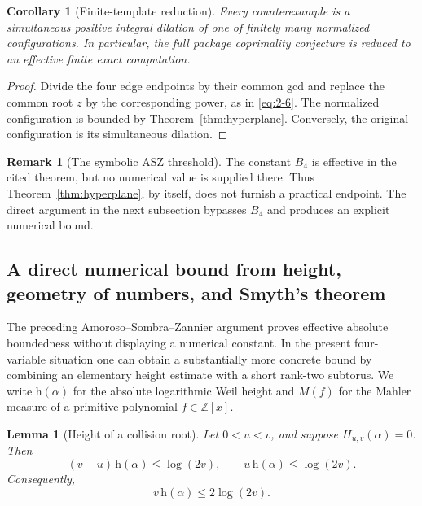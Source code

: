 \documentclass[11pt]{article}
\numberwithin{equation}{section}
\newtheorem{lemma}[theorem]{Lemma}
\newtheorem{corollary}[theorem]{Corollary}
\theoremstyle{definition}
\newtheorem{remark}[theorem]{Remark}
\newcommand{\Z}{\mathbb Z}
\begin{document}
\begin{corollary}[Finite-template reduction]\label{cor:finiteglobal}
Every counterexample is a simultaneous positive integral dilation of one of
finitely many normalized configurations.  In particular, the full package
coprimality conjecture is reduced to an effective finite exact computation.
\end{corollary}

\begin{proof}
Divide the four edge endpoints by their common gcd and replace the common
root \(z\) by the corresponding power, as in \eqref{eq:2-6}.  The normalized
configuration is bounded by Theorem~\ref{thm:hyperplane}.  Conversely, the
original configuration is its simultaneous dilation.
\end{proof}

\begin{remark}[The symbolic ASZ threshold]
The constant \(B_4\) is effective in the cited theorem, but no numerical
value is supplied there.  Thus Theorem~\ref{thm:hyperplane}, by itself, does
not furnish a practical endpoint.  The direct argument in the next subsection
bypasses \(B_4\) and produces an explicit numerical bound.
\end{remark}

\subsection{A direct numerical bound from height, geometry of numbers, and Smyth's theorem}
\label{subsec:explicitbound}

The preceding Amoroso--Sombra--Zannier argument proves effective absolute
boundedness without displaying a numerical constant.  In the present
four-variable situation one can obtain a substantially more concrete bound
by combining an elementary height estimate with a short rank-two subtorus.
We write \(\mathrm h(\alpha)\) for the absolute logarithmic Weil height and
\(M(f)\) for the Mahler measure of a primitive polynomial \(f\in\Z[x]\).

\begin{lemma}[Height of a collision root]\label{lem:collisionheight}
Let \(0<u<v\), and suppose \(H_{u,v}(\alpha)=0\).  Then
\begin{equation}
 (v-u)\,\mathrm h(\alpha)\leq\log(2v),
 \qquad
 u\,\mathrm h(\alpha)\leq\log(2v).
 \label{eq:17-5}
\end{equation}
Consequently,
\begin{equation}
 v\,\mathrm h(\alpha)\leq2\log(2v).
 \label{eq:17-6}
\end{equation}
\end{lemma}
\end{document}
